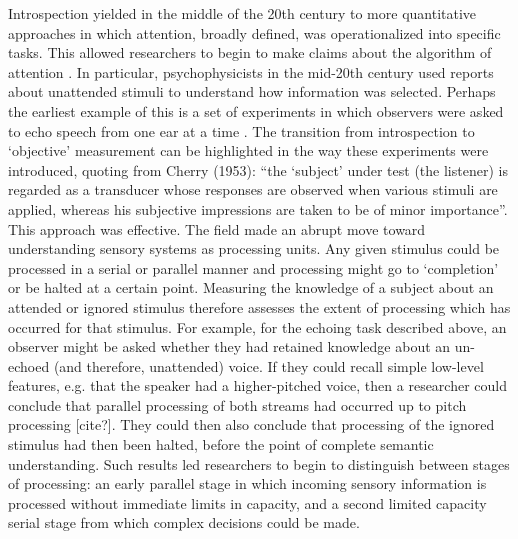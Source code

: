 Introspection yielded in the middle of the 20th century to more quantitative approaches in which attention, broadly defined, was operationalized into specific tasks. This allowed researchers to begin to make claims about the algorithm of attention \citep{Marr1982-fg}. In particular, psychophysicists in the mid-20th century used reports about unattended stimuli to understand how information was selected. Perhaps the earliest example of this is a set of experiments in which observers were asked to echo speech from one ear at a time \citep{Cherry1953-as}. The transition from introspection to ‘objective’ measurement can be highlighted in the way these experiments were introduced, quoting from Cherry (1953): ``the `subject' under test (the listener) is regarded as a transducer whose responses are observed when various stimuli are applied, whereas his subjective impressions are taken to be of minor importance''. This approach was effective. The field made an abrupt move toward understanding sensory systems as processing units. Any given stimulus could be processed in a serial or parallel manner and processing might go to `completion' or be halted at a certain point. Measuring the knowledge of a subject about an attended or ignored stimulus therefore assesses the extent of processing which has occurred for that stimulus. For example, for the echoing task described above, an observer might be asked whether they had retained knowledge about an un-echoed (and therefore, unattended) voice. If they could recall simple low-level features, e.g. that the speaker had a higher-pitched voice, then a researcher could conclude that parallel processing of both streams had occurred up to pitch processing [cite?]. They could then also conclude that processing of the ignored stimulus had then been halted, before the point of complete semantic understanding. Such results led researchers to begin to distinguish between stages of processing: an early parallel stage in which incoming sensory information is processed without immediate limits in capacity, and a second limited capacity serial stage from which complex decisions could be made.

